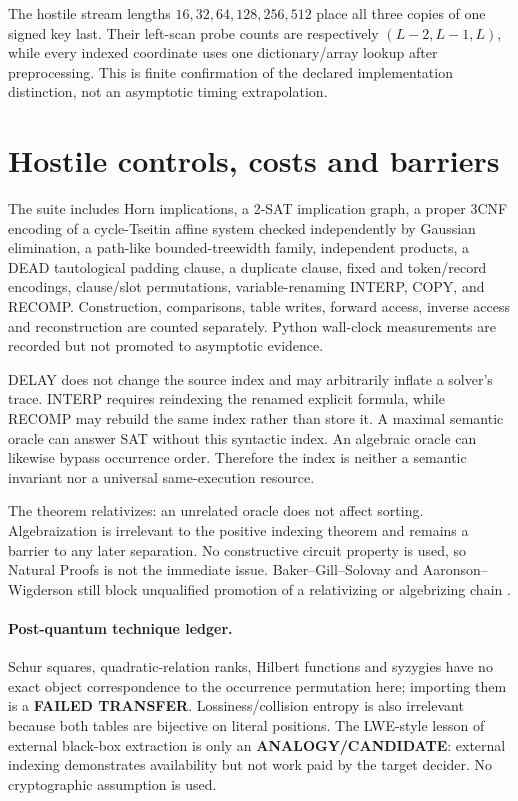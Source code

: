 \documentclass[11pt]{article}
\begin{document}
The hostile stream lengths $16,32,64,128,256,512$ place all three copies of
one signed key last.  Their left-scan probe counts are respectively
$(L-2,L-1,L)$, while every indexed coordinate uses one dictionary/array
lookup after preprocessing.  This is finite confirmation of the declared
implementation distinction, not an asymptotic timing extrapolation.

\section{Hostile controls, costs and barriers}

The suite includes Horn implications, a 2-SAT implication graph, a proper
3CNF encoding of a cycle-Tseitin affine system checked independently by
Gaussian elimination, a path-like bounded-treewidth family, independent
products, a DEAD tautological padding clause, a duplicate clause, fixed and
token/record encodings, clause/slot permutations, variable-renaming INTERP,
COPY, and RECOMP.  Construction, comparisons, table writes, forward access,
inverse access and reconstruction are counted separately.  Python wall-clock
measurements are recorded but not promoted to asymptotic evidence.

DELAY does not change the source index and may arbitrarily inflate a solver's
trace.  INTERP requires reindexing the renamed explicit formula, while RECOMP
may rebuild the same index rather than store it.  A maximal semantic oracle
can answer SAT without this syntactic index.  An algebraic oracle can likewise
bypass occurrence order.  Therefore the index is neither a semantic
invariant nor a universal same-execution resource.

The theorem relativizes: an unrelated oracle does not affect sorting.
Algebraization is irrelevant to the positive indexing theorem and remains a
barrier to any later separation.  No constructive circuit property is used,
so Natural Proofs is not the immediate issue.  Baker--Gill--Solovay and
Aaronson--Wigderson still block unqualified promotion of a relativizing or
algebrizing chain \cite{bgs,aw}.

\paragraph{Post-quantum technique ledger.}
Schur squares, quadratic-relation ranks, Hilbert functions and syzygies have
no exact object correspondence to the occurrence permutation here; importing
them is a \textbf{FAILED TRANSFER}.  Lossiness/collision entropy is also
irrelevant because both tables are bijective on literal positions.  The
LWE-style lesson of external black-box extraction is only an
\textbf{ANALOGY/CANDIDATE}: external indexing demonstrates availability but
not work paid by the target decider.  No cryptographic assumption is used.
\end{document}
